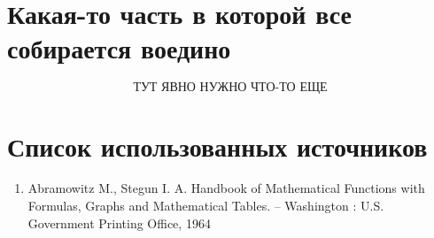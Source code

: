 \documentclass{article}
\begin{document}
\section{Какая-то часть в которой все собирается воедино}
\[
\textbf{ТУТ ЯВНО НУЖНО ЧТО-ТО  ЕЩЕ}
\]
\section{Список использованных источников}

\begin{enumerate}
\item Abramowitz M., Stegun I. A. Handbook of Mathematical Functions with Formulas, Graphs and Mathematical Tables. -- Washington : U.S. Government Printing Office, 1964
\label{book:Handbook}
\end{enumerate}
\end{document}
